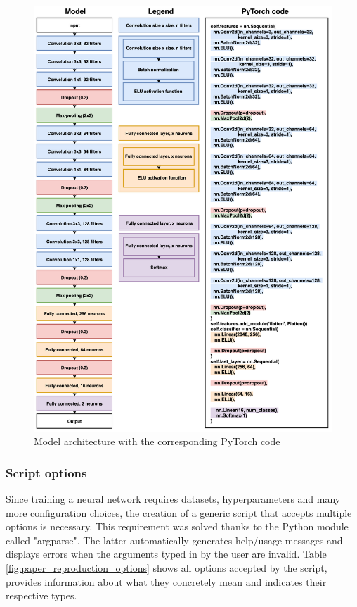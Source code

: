 \begin{figure}[!h]
\centering
\includegraphics[width=1\textwidth, keepaspectratio=true]{./figures/model_paper_manual.png}
\caption{Model architecture with the corresponding PyTorch code}
\label{fig:paper_model}
\end{figure}

\subsubsection{Script options}
\setlength{\marginparwidth}{3cm}\leavevmode {}
Since training a neural network requires datasets, hyperparameters and many more configuration choices, the creation of a generic script that accepts multiple options is necessary. This requirement was solved thanks to the Python module called "argparse". The latter automatically generates help/usage messages and displays errors when the arguments typed in by the user are invalid. Table \ref{fig:paper_reproduction_options} shows all options accepted by the script, provides information about what they concretely mean and indicates their respective types.


